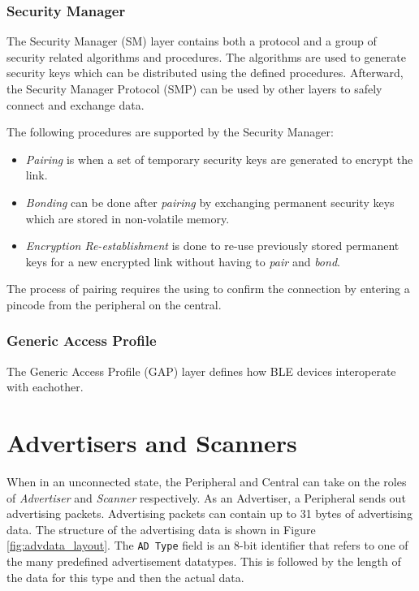 \subsubsection{Security Manager}
The Security Manager (SM) layer contains both a protocol and a group of security related algorithms and procedures. The algorithms are used to generate security keys which can be distributed using the defined procedures. Afterward, the Security Manager Protocol (SMP) can be used by other layers to safely connect and exchange data.

The following procedures are supported by the Security Manager:
\begin{itemize}
    \item \textit{Pairing} is when a set of temporary security keys are generated to encrypt the link.
    \item \textit{Bonding} can be done after \textit{pairing} by exchanging permanent security keys which are stored in non-volatile memory.
    \item \textit{Encryption Re-establishment} is done to re-use previously stored permanent keys for a new encrypted link without having to \textit{pair} and \textit{bond}.
\end{itemize}

The process of pairing requires the using to confirm the connection by entering a pincode from the peripheral on the central.

\subsubsection{Generic Access Profile}
The Generic Access Profile (GAP) layer defines how BLE devices interoperate with eachother.

\section{Advertisers and Scanners}
When in an unconnected state, the Peripheral and Central can take on the roles of \textit{Advertiser} and \textit{Scanner} respectively. As an Advertiser, a Peripheral sends out advertising packets. Advertising packets can contain up to 31 bytes of advertising data. The structure of the advertising data is shown in Figure \ref{fig:advdata_layout}. The \texttt{AD Type} field is an 8-bit identifier that refers to one of the many predefined advertisement datatypes. This is followed by the length of the data for this type and then the actual data. 

